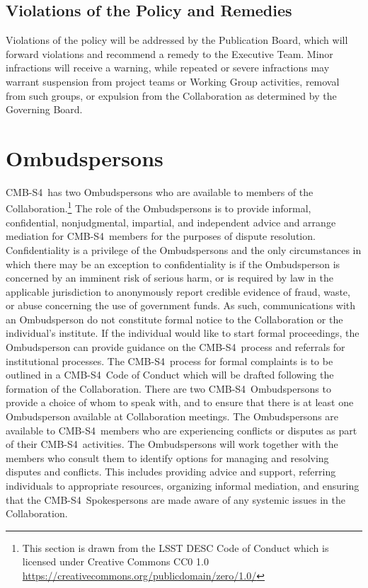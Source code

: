 \documentclass[12pt]{article}
\newcommand\collabname{CMB-S4}
\begin{document}


\subsection{Violations of the Policy and Remedies}
Violations of the policy will be addressed by the Publication Board, which will forward violations and recommend a remedy to the Executive Team.  Minor infractions will receive a warning, while repeated or severe infractions may warrant suspension from project teams or Working Group activities, removal from such groups, or expulsion from the Collaboration as determined by the Governing Board.


\section{Ombudspersons}

\collabname\ has two Ombudspersons who are available to members of the Collaboration.\footnote{This section is drawn from the LSST DESC Code of Conduct which is licensed under Creative Commons CC0 1.0 \url{https://creativecommons.org/publicdomain/zero/1.0/}} The role of the Ombudspersons is to provide informal, confidential, nonjudgmental, impartial, and independent advice and arrange mediation for \collabname\ members for the purposes of dispute resolution. Confidentiality is a privilege of the Ombudspersons and the only circumstances in which there may be an exception to confidentiality is if the Ombudsperson is concerned by an imminent risk of serious harm, or is required by law in the applicable jurisdiction to anonymously report credible evidence of fraud, waste, or abuse concerning the use of government funds. As such, communications with an Ombudsperson do not constitute formal notice to the Collaboration or the individual's institute. If the individual would like to start formal proceedings, the Ombudsperson can provide guidance on the \collabname\ process and referrals for institutional processes. The \collabname\ process for formal complaints is to be outlined in a \collabname\ Code of Conduct which will be drafted following the formation of the Collaboration. There are two \collabname\ Ombudspersons to provide a choice of whom to speak with, and to ensure that there is at least one Ombudsperson available at Collaboration meetings. The Ombudspersons are available to \collabname\ members who are experiencing conflicts or disputes as part of their \collabname\ activities. The Ombudspersons will work together with the members who consult them to identify options for managing and resolving disputes and conflicts. This includes providing advice and support, referring individuals to appropriate resources, organizing informal mediation, and ensuring that the \collabname\ Spokespersons are made aware of any systemic issues in the Collaboration. 
\end{document}
